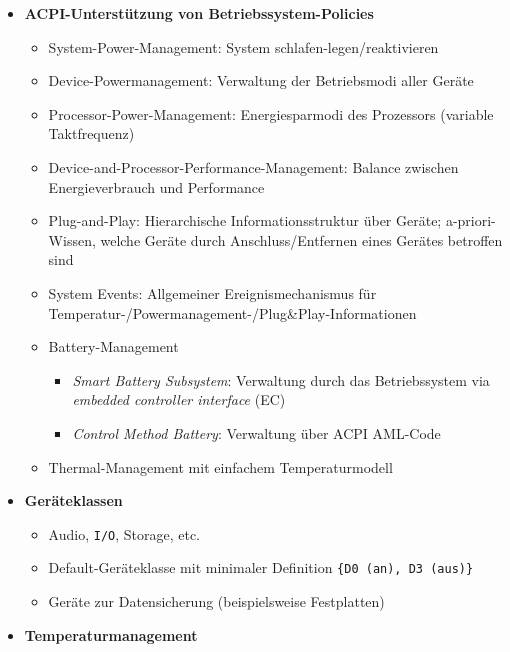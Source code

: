 \begin{itemize}
	\item \textbf{ACPI-Unterstützung von Betriebssystem-Policies}
	\begin{itemize}
		\item System-Power-Management: System schlafen-legen/reaktivieren
		\item Device-Powermanagement: Verwaltung der Betriebsmodi aller Geräte
		\item Processor-Power-Management: Energiesparmodi des Prozessors (variable Taktfrequenz)
		\item Device-and-Processor-Performance-Management: Balance zwischen Energieverbrauch und Performance
		\item Plug-and-Play: Hierarchische Informationsstruktur über Geräte; a-priori-Wissen, welche Geräte durch Anschluss/Entfernen eines Gerätes betroffen sind
		\item System Events: Allgemeiner Ereignismechanismus für Temperatur-/Powermanagement-/Plug\&Play-Informationen
		\item Battery-Management
		\begin{itemize}
			\item \textit{Smart Battery Subsystem}: Verwaltung durch das Betriebssystem via \textit{embedded controller interface} (EC)
			\item \textit{Control Method Battery}: Verwaltung über ACPI AML-Code
		\end{itemize}
		\item Thermal-Management mit einfachem Temperaturmodell
	\end{itemize}
	\item \textbf{Geräteklassen}
	\begin{itemize}
		\item Audio, \texttt{I/O}, Storage, etc.
		\item Default-Geräteklasse mit minimaler Definition \texttt{\big\{D0 (an), D3 (aus)\big\}}
		\item Geräte zur Datensicherung (beispielsweise Festplatten)
	\end{itemize}
	\item \textbf{Temperaturmanagement}

\end{itemize}
